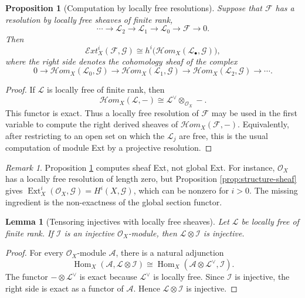 \documentclass[11pt,a4paper]{article}
\numberwithin{equation}{section}
\theoremstyle{plain}
\newtheorem{proposition}[theorem]{Proposition}
\newtheorem{lemma}[theorem]{Lemma}
\theoremstyle{definition}
\theoremstyle{remark}
\newtheorem{remark}[theorem]{Remark}
\newcommand{\OO}{\mathcal O}
\newcommand{\F}{\mathcal F}
\newcommand{\G}{\mathcal G}
\newcommand{\LL}{\mathcal L}
\newcommand{\I}{\mathcal I}
\newcommand{\A}{\mathcal A}
\DeclareMathOperator{\Ext}{Ext}
\DeclareMathOperator{\Hom}{Hom}
\newcommand{\sExt}{\mathcal{E}\!xt}
\newcommand{\sHom}{\mathcal{H}\!om}
\begin{document}
\begin{proposition}[Computation by locally free resolutions]\label{prop:locally-free-resolution}
Suppose that \(\F\) has a resolution by locally free sheaves of finite rank,
\[
  \cdots\longrightarrow \LL_2\longrightarrow \LL_1
  \longrightarrow \LL_0\longrightarrow \F\longrightarrow0.
\]
Then
\[
  \sExt_X^i(\F,\G)
  \cong
  h^i\bigl(\sHom_X(\LL_\bullet,\G)\bigr),
\]
where the right side denotes the cohomology sheaf of the complex
\[
  0\longrightarrow \sHom_X(\LL_0,\G)
  \longrightarrow \sHom_X(\LL_1,\G)
  \longrightarrow \sHom_X(\LL_2,\G)
  \longrightarrow\cdots .
\]
\end{proposition}

\begin{proof}
If \(\LL\) is locally free of finite rank, then
\[
  \sHom_X(\LL,-)\cong \LL^\vee\otimes_{\OO_X}-.
\]
This functor is exact.  Thus a locally free resolution of \(\F\) may be used in the first variable to compute the right derived sheaves of \(\sHom_X(\F,-)\).  Equivalently, after restricting to an open set on which the \(\LL_j\) are free, this is the usual computation of module Ext by a projective resolution.
\end{proof}

\begin{remark}\label{rem:global-not-computed}
Proposition \ref{prop:locally-free-resolution} computes sheaf Ext, not global Ext.  For instance, \(\OO_X\) has a locally free resolution of length zero, but Proposition \ref{prop:structure-sheaf} gives \(\Ext_X^i(\OO_X,\G)=H^i(X,\G)\), which can be nonzero for \(i>0\).  The missing ingredient is the non-exactness of the global section functor.
\end{remark}

\begin{lemma}[Tensoring injectives with locally free sheaves]\label{lem:injective-tensor}
Let \(\LL\) be locally free of finite rank.  If \(\I\) is an injective \(\OO_X\)-module, then \(\LL\otimes\I\) is injective.
\end{lemma}

\begin{proof}
For every \(\OO_X\)-module \(\A\), there is a natural adjunction
\[
  \Hom_X(\A,\LL\otimes\I)
  \cong
  \Hom_X(\A\otimes\LL^\vee,\I).
\]
The functor \(-\otimes\LL^\vee\) is exact because \(\LL^\vee\) is locally free.  Since \(\I\) is injective, the right side is exact as a functor of \(\A\).  Hence \(\LL\otimes\I\) is injective.
\end{proof}
\end{document}
